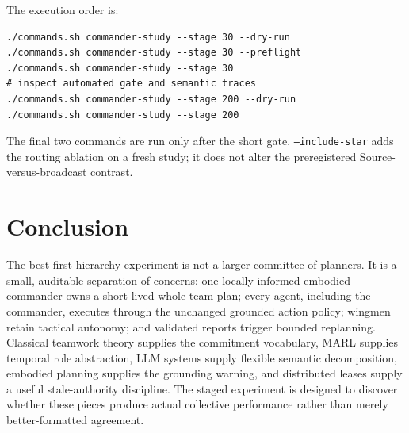 \documentclass[11pt]{article}
\newcommand{\code}[1]{\texttt{#1}}
\begin{document}
The execution order is:
\begin{verbatim}
./commands.sh commander-study --stage 30 --dry-run
./commands.sh commander-study --stage 30 --preflight
./commands.sh commander-study --stage 30
# inspect automated gate and semantic traces
./commands.sh commander-study --stage 200 --dry-run
./commands.sh commander-study --stage 200
\end{verbatim}
The final two commands are run only after the short gate.  \code{--include-star}
adds the routing ablation on a fresh study; it does not alter the preregistered
Source-versus-broadcast contrast.

\section{Conclusion}

The best first hierarchy experiment is not a larger committee of planners.  It
is a small, auditable separation of concerns: one locally informed embodied
commander owns a short-lived whole-team plan; every agent, including the
commander, executes through the unchanged grounded action policy; wingmen retain
tactical autonomy; and validated reports trigger bounded replanning.  Classical
teamwork theory supplies the commitment vocabulary, MARL supplies temporal role
abstraction, LLM systems supply flexible semantic decomposition, embodied
planning supplies the grounding warning, and distributed leases supply a useful
stale-authority discipline.  The staged experiment is designed to discover
whether these pieces produce actual collective performance rather than merely
better-formatted agreement.



\end{document}

